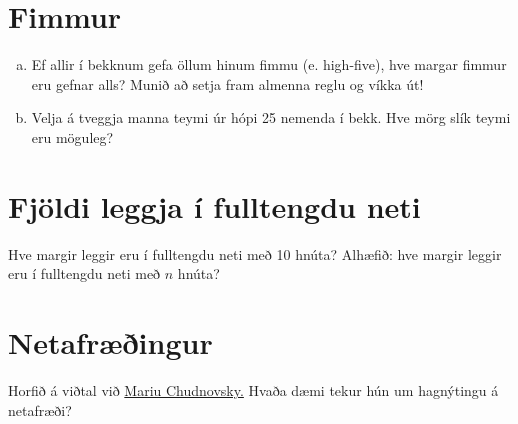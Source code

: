 \documentclass[b5paper,12pt]{book}
\begin{document}
\section{Fimmur}
\begin{enumerate}[(a)]
\item Ef allir í bekknum gefa öllum hinum fimmu (e. high-five), hve margar fimmur eru gefnar alls? Munið að setja fram almenna reglu og víkka út!
\item Velja á tveggja manna teymi úr hópi 25 nemenda í bekk. Hve mörg slík teymi eru möguleg?
\end{enumerate}

\section{Fjöldi leggja í fulltengdu neti}
Hve margir leggir eru í fulltengdu neti með 10 hnúta? Alhæfið: hve margir leggir eru í fulltengdu neti með $n$ hnúta?

\section{Netafræðingur}
Horfið á viðtal við \href {https://youtu.be/4p2uSjQkW2g} {Mariu Chudnovsky.} Hvaða dæmi tekur hún um hagnýtingu á netafræði? 
\end{document}
